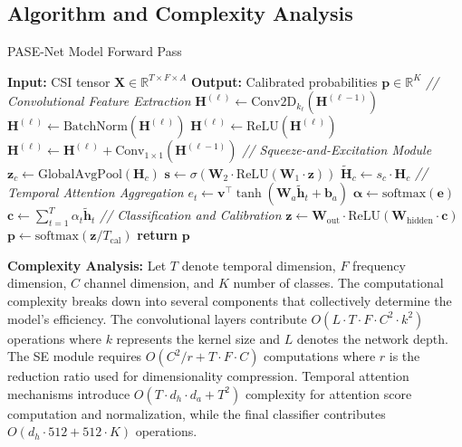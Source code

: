 \documentclass[lettersize,journal]{IEEEtran}
\begin{document}
\subsection{Algorithm and Complexity Analysis}

\begin{algorithm}
\caption{PASE-Net Model Forward Pass}
\label{alg:enhanced}
\begin{algorithmic}[1]
\STATE \textbf{Input:} CSI tensor $\mathbf{X} \in \mathbb{R}^{T \times F \times A}$
\STATE \textbf{Output:} Calibrated probabilities $\mathbf{p} \in \mathbb{R}^K$
\STATE
\STATE \textit{// Convolutional Feature Extraction}
    \STATE $\mathbf{H}^{(\ell)} \leftarrow \text{Conv2D}_{k_\ell}(\mathbf{H}^{(\ell-1)})$ 
    \STATE $\mathbf{H}^{(\ell)} \leftarrow \text{BatchNorm}(\mathbf{H}^{(\ell)})$
    \STATE $\mathbf{H}^{(\ell)} \leftarrow \text{ReLU}(\mathbf{H}^{(\ell)})$
        \STATE $\mathbf{H}^{(\ell)} \leftarrow \mathbf{H}^{(\ell)} + \text{Conv}_{1\times1}(\mathbf{H}^{(\ell-1)})$
    \ENDIF
\ENDFOR
\STATE
\STATE \textit{// Squeeze-and-Excitation Module}
    \STATE $\mathbf{z}_c \leftarrow \text{GlobalAvgPool}(\mathbf{H}_c)$ 
    \STATE $\mathbf{s} \leftarrow \sigma(\mathbf{W}_2 \cdot \text{ReLU}(\mathbf{W}_1 \cdot \mathbf{z}))$ 
    \STATE $\tilde{\mathbf{H}}_c \leftarrow s_c \cdot \mathbf{H}_c$ 
\ENDFOR
\STATE
\STATE \textit{// Temporal Attention Aggregation}
    \STATE $e_t \leftarrow \mathbf{v}^\top \tanh(\mathbf{W}_a \tilde{\mathbf{h}}_t + \mathbf{b}_a)$ 
\ENDFOR
\STATE $\boldsymbol{\alpha} \leftarrow \text{softmax}(\mathbf{e})$ 
\STATE $\mathbf{c} \leftarrow \sum_{t=1}^T \alpha_t \tilde{\mathbf{h}}_t$ 
\STATE
\STATE \textit{// Classification and Calibration}
\STATE $\mathbf{z} \leftarrow \mathbf{W}_{\text{out}} \cdot \text{ReLU}(\mathbf{W}_{\text{hidden}} \cdot \mathbf{c})$
\STATE $\mathbf{p} \leftarrow \text{softmax}(\mathbf{z} / T_{\text{cal}})$ 
\STATE \textbf{return} $\mathbf{p}$
\end{algorithmic}
\end{algorithm}

\textbf{Complexity Analysis:} Let $T$ denote temporal dimension, $F$ frequency dimension, $C$ channel dimension, and $K$ number of classes. The computational complexity breaks down into several components that collectively determine the model's efficiency. The convolutional layers contribute $O(L \cdot T \cdot F \cdot C^2 \cdot k^2)$ operations where $k$ represents the kernel size and $L$ denotes the network depth. The SE module requires $O(C^2/r + T \cdot F \cdot C)$ computations where $r$ is the reduction ratio used for dimensionality compression. Temporal attention mechanisms introduce $O(T \cdot d_h \cdot d_a + T^2)$ complexity for attention score computation and normalization, while the final classifier contributes $O(d_h \cdot 512 + 512 \cdot K)$ operations.
\end{document}
